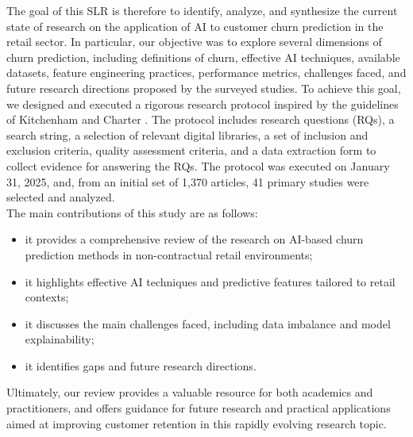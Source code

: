 The goal of this SLR is therefore to identify, analyze, and synthesize the current state of research on the application of AI to customer churn prediction in the retail sector. 
In particular, our objective was to explore several dimensions of churn prediction, including definitions of churn, effective AI techniques, available datasets, feature engineering practices, performance metrics, challenges faced, and future research directions proposed by the surveyed studies. %
To achieve this goal, we designed and executed a rigorous research protocol inspired by the guidelines of Kitchenham and Charter \cite{Kitchenham-Charters-guidelines}. The protocol includes research questions (RQs), a search string, a selection of relevant digital libraries, a set of inclusion and exclusion criteria, quality assessment criteria, and a data extraction form to collect evidence for answering the RQs. The protocol was executed on January 31, 2025, and, from an initial set of 1,370 articles, 41 primary studies were selected and analyzed.  \\

\noindent The main contributions of this study are as follows: 
\begin{itemize}[itemsep=0pt]
\item it provides a comprehensive review of the research on AI-based churn prediction methods in non-contractual retail environments;
\item it highlights effective AI techniques and predictive features tailored to retail contexts;
\item it discusses the main challenges faced, including data imbalance and model explainability;
\item it identifies gaps and future research directions.
\end{itemize}



Ultimately, our review provides a valuable resource for both academics and practitioners, and offers guidance for future research and practical applications aimed at improving customer retention in this rapidly evolving research topic.

